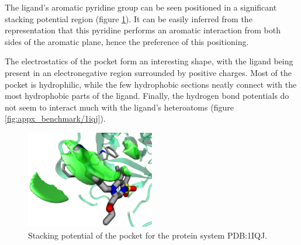       The ligand's aromatic pyridine group can be seen positioned in a significant stacking potential region (figure \ref{fig:benchmark/1iqj}). It can be easily inferred from the representation that this pyridine performs an aromatic interaction from both sides of the aromatic plane, hence the preference of this positioning.

      The electrostatics of the pocket form an interesting shape, with the ligand being present in an electronegative region surrounded by positive charges. Most of the pocket is hydrophilic, while the few hydrophobic sections neatly connect with the most hydrophobic parts of the ligand. Finally, the hydrogen bond potentials do not seem to interact much with the ligand's heteroatoms (figure \ref{fig:appx_benchmark/1iqj}).

      \begin{figure}[H]
        \centering
        \includegraphics[width=0.5\textwidth]{figures/results/benchmark_prot/1iqj.png}
        \caption{\label{fig:benchmark/1iqj} Stacking potential of the pocket for the protein system PDB:1IQJ.}
      \end{figure}
    \pagebreak

